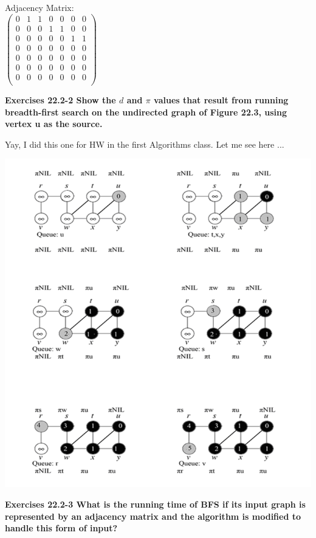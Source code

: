 \documentclass[10pt,fullpage]{article}
\begin{document}
Adjacency Matrix:\\
$\left(
  \begin{array}{ccccccc}
    0 & 1 & 1 & 0 & 0 & 0 & 0 \\
    0 & 0 & 0 & 1 & 1 & 0 & 0 \\
    0 & 0 & 0 & 0 & 0 & 1 & 1 \\
    0 & 0 & 0 & 0 & 0 & 0 & 0 \\
    0 & 0 & 0 & 0 & 0 & 0 & 0 \\
    0 & 0 & 0 & 0 & 0 & 0 & 0 \\
    0 & 0 & 0 & 0 & 0 & 0 & 0 \\
  \end{array}
\right)$

\newpage

\textbf{Exercises 22.2-2 Show the $d$ and $\pi$ values that result
from running breadth-first search on the undirected graph of Figure
22.3, using vertex u as the source.}

Yay, I did this one for HW in the first Algorithms class. Let me see
here ...

\includegraphics[scale=0.5]{22_2.png}

\newpage

\textbf{Exercises 22.2-3 What is the running time of BFS if its
input graph is represented by an adjacency matrix and the algorithm
is modified to handle this form of input?}
\end{document}
